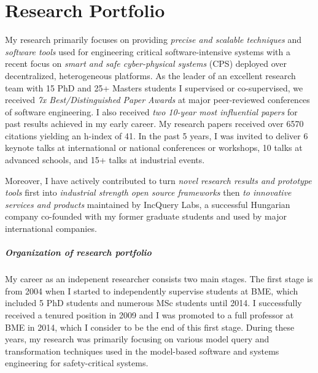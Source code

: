\chapter{Research Portfolio}

\begin{tcolorbox}[title=Summary of Excellence]
My research primarily focuses on providing \emph{precise and scalable techniques} and \emph{software tools} used for engineering critical software-intensive systems with a recent focus on \emph{smart and safe cyber-physical systems} (CPS) deployed over decentralized, heterogeneous platforms. As the leader of an excellent research team with 15 PhD and 25+ Masters students I supervised or co-supervised, we received \emph{7x Best/Distinguished Paper Awards} at major peer-reviewed conferences of software engineering. I also received \emph{two 10-year most influential papers} for past results achieved in my early career. My research papers received over 6570 citations yielding an h-index of 41. In the past 5 years, I was invited to deliver 6 keynote talks at international or national conferences or workshops, 10 talks at advanced schools, and 15+ talks at industrial events.

\vspace{3pt}

Moreover, I have actively contributed to turn \emph{novel research results and prototype tools} first into \emph{industrial strength open source frameworks} then \emph{to innovative services and products} maintained by IncQuery Labs, a successful Hungarian company co-founded with my former graduate students and used by major international companies.
\end{tcolorbox}

\paragraph{Organization of research portfolio}

My career as an indepenent researcher consists two main stages. The first stage is from 2004 when I started to independently supervise students at BME, which included 5 PhD students and numerous MSc students until 2014.
I successfully received a tenured position in 2009 and I was promoted to a full professor at BME in 2014, which I consider to be the end of this first stage. During these years, my research was primarily focusing on various model query and transformation techniques used in the model-based software and systems engineering for safety-critical systems. 

